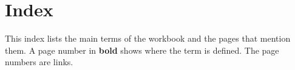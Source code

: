 \clearpage
\section{Index}\label{sec:index}

This index lists the main terms of the workbook and the pages that mention them.
A page number in \textbf{bold} shows where the term is defined.
The page numbers are links.

\makeatletter
\renewenvironment{theindex}{%
  \begin{multicols}{2}%
  \small
  \setlength{\parindent}{0pt}%
  \setlength{\parskip}{0pt plus 0.3pt}%
  \raggedright
  \renewcommand\item{\par\hangindent=2em\hangafter=1\relax}%
  \renewcommand\subitem{\par\nopagebreak\hangindent=3em\hangafter=1\hspace*{1em}}%
  \renewcommand\indexspace{\par\vspace{0.5\baselineskip}}%
}{%
  \end{multicols}%
}
\makeatother
\NewDocumentCommand{}

\printindex
